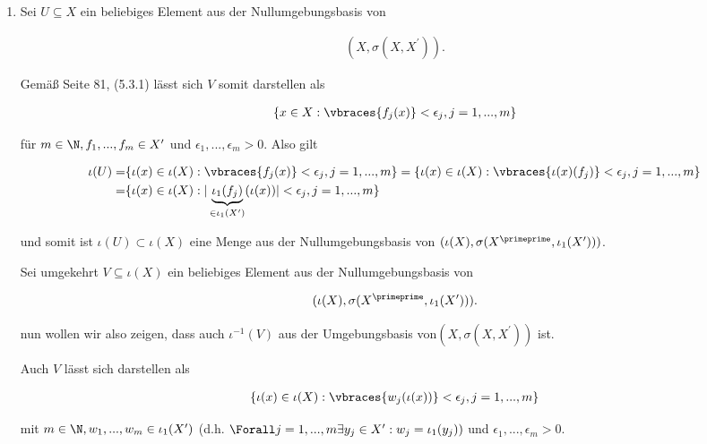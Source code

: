 \begin{solution}

\phantom{}

\begin{enumerate}[label = (\arabic*)]

  \item


  Sei $U \subseteq X$ ein beliebiges Element aus der Nullumgebungsbasis von

  \begin{align*}
    (X,\sigma(X,X^{\prime})).
  \end{align*}

  Gemäß Seite 81, (5.3.1) lässt sich $V$ somit darstellen als

  \begin{align*}
    \{x \in X: \vbraces{f_{j}(x)}<\epsilon_j, j=1,...,m\}
  \end{align*}

  für $m \in \N,f_1,...,f_m \in X^{\prime}$ und $\epsilon_1,...,\epsilon_m > 0$.
  Also gilt

  \begin{align*}
    \iota(U) =& \{\iota(x) \in \iota(X): \vbraces{f_{j}(x)}<\epsilon_j, j=1,...,m\} = \{\iota(x) \in \iota(X): \vbraces{\iota(x)(f_{j})}<\epsilon_j, j=1,...,m\} \\
    =& \{\iota(x) \in \iota(X): |\underbrace{\iota_1 (f_{j})}_{\in \iota_1 (X^{\prime})}(\iota(x))|<\epsilon_j, j=1,...,m\}
  \end{align*}

  und somit ist $\iota(U) \subset \iota(X)$ eine Menge aus der Nullumgebungsbasis von $(\iota(X),\sigma(X^{\primeprime},\iota_1(X^{\prime})))$.

  Sei umgekehrt $V \subseteq \iota(X)$ ein beliebiges Element aus der Nullumgebungsbasis von

  \begin{align*}
    (\iota(X),\sigma(X^{\primeprime},\iota_1(X^{\prime}))).
  \end{align*}

  nun wollen wir also zeigen, dass auch $\iota^{-1}(V)$ aus der Umgebungsbasis von$(X,\sigma(X,X^{\prime}))$ ist.

  Auch $V$ lässt sich darstellen als

  \begin{align*}
    \{\iota(x) \in \iota(X): \vbraces{w_{j}(\iota(x))}<\epsilon_j, j=1,...,m\}
  \end{align*}

  mit $m \in \N,w_1,...,w_m \in \iota_1(X^{\prime})$ (d.h. $\Forall j = 1,...,m \exists y_j \in X^{\prime} : w_j = \iota_1(y_j))$ und $\epsilon_1,...,\epsilon_m > 0$.


\end{enumerate}
\end{solution}
